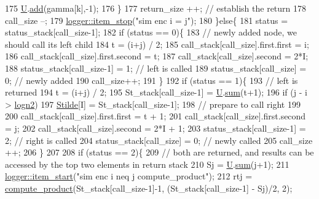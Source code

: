 \begin{DoxyCode}
175         \hyperlink{classgraph__encoder_a3314c40920f2ee132958a6b0ce7e7995}{U}.\hyperlink{classreverse__fenwick__tree_a942d7f49b37e53ebfec3076d177691d7}{add}(gamma[k],-1);
176       \}
177       return\_size ++; \textcolor{comment}{// establish the return}
178       call\_size --;
179       \hyperlink{classlogger_a6775fee9681c437fc9c05d71cfbbe4a2}{logger::item\_stop}(\textcolor{stringliteral}{"sim enc i = j"});
180     \}\textcolor{keywordflow}{else}\{
181       status = status\_stack[call\_size-1];
182       \textcolor{keywordflow}{if} (status == 0)\{
183         \textcolor{comment}{// newly added node, we should call its left child}
184         t = (i+j) / 2;
185         call\_stack[call\_size].first.first = i;
186         call\_stack[call\_size].first.second = t;
187         call\_stack[call\_size].second = 2*I;
188         status\_stack[call\_size-1] = 1; \textcolor{comment}{// left is called}
189         status\_stack[call\_size] = 0; \textcolor{comment}{// newly added}
190         call\_size++;
191       \}
192       \textcolor{keywordflow}{if} (status == 1)\{
193         \textcolor{comment}{// left is returned}
194         t = (i+j) / 2;
195         St\_stack[call\_size-1] = \hyperlink{classgraph__encoder_a3314c40920f2ee132958a6b0ce7e7995}{U}.\hyperlink{classreverse__fenwick__tree_a672731fd6395b4853430073a099a80e6}{sum}(t+1);
196         \textcolor{keywordflow}{if} (j - i > \hyperlink{classgraph__encoder_a27fde3a95a280304877b1e37fc4d8553}{logn2})
197           \hyperlink{classgraph__encoder_a342688a3fdee511b7fae3f155cfb10cf}{Stilde}[I] = St\_stack[call\_size-1];
198         \textcolor{comment}{// prepare to call right}
199         
200         call\_stack[call\_size].first.first = t + 1;
201         call\_stack[call\_size].first.second = j;
202         call\_stack[call\_size].second = 2*I + 1;
203         status\_stack[call\_size-1] = 2; \textcolor{comment}{// right is called}
204         status\_stack[call\_size] = 0; \textcolor{comment}{// newly called}
205         call\_size ++;
206       \}
207 
208       \textcolor{keywordflow}{if} (status == 2)\{
209         \textcolor{comment}{// both are returned, and results can be accessed by the top two elements in return stack}
210         Sj = \hyperlink{classgraph__encoder_a3314c40920f2ee132958a6b0ce7e7995}{U}.\hyperlink{classreverse__fenwick__tree_a672731fd6395b4853430073a099a80e6}{sum}(j+1);
211         \hyperlink{classlogger_a7e21ec6ad2d40cfc2c6a383521b5641a}{logger::item\_start}(\textcolor{stringliteral}{"sim enc i neq j compute\_product"});
212         rtj = \hyperlink{compression__helper_8cpp_ae2afb43aabe50f7d42aae8f82b5a35f4}{compute\_product}(St\_stack[call\_size-1]-1, (St\_stack[call\_size-1] - Sj)/2, 2);

\end{DoxyCode}
